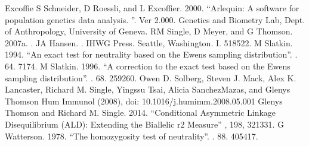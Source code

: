\documentclass[letterpaper,10pt,english,openany,oneside]{sphinxmanual}
\begin{document}
\begin{sphinxthebibliography}{Excoffie}
\sphinxAtStartPar
S Schneider, D Roessli, and L Excoffier.
2000. “Arlequin: A software for population genetics data analysis.
”. Ver 2.000. Genetics and Biometry
Lab, Dept. of Anthropology, University of Geneva.
\sphinxAtStartPar
RM Single, D Meyer, and G Thomson. 2007a.
.
JA Hansen. .
IHWG Press. Seattle, Washington. I. 518\sphinxhyphen{}522.
\sphinxAtStartPar
M Slatkin. 1994. “An exact test for neutrality
based on the Ewens sampling distribution”. .
64. 71\sphinxhyphen{}74.
\sphinxAtStartPar
M Slatkin. 1996. “A correction to the exact test
based on the Ewens sampling distribution”. .
68. 259\sphinxhyphen{}260.
\sphinxAtStartPar
Owen D. Solberg, Steven J. Mack, Alex K. Lancaster,
Richard M. Single, Yingssu Tsai, Alicia Sanchez\sphinxhyphen{}Mazas, and Glenys
Thomson Hum Immunol (2008), doi: 10.1016/j.humimm.2008.05.001
\sphinxAtStartPar
Glenys Thomson and Richard M. Single. 2014.
“Conditional Asymmetric Linkage Disequilibrium (ALD): Extending the
Biallelic r2 Measure” , 198, 321\textendash{}331.
\sphinxAtStartPar
G Watterson. 1978. “The homozygosity test of
neutrality”. . 88. 405\sphinxhyphen{}417.
\end{sphinxthebibliography}



\renewcommand{\indexname}{Index}
\printindex
\end{document}

